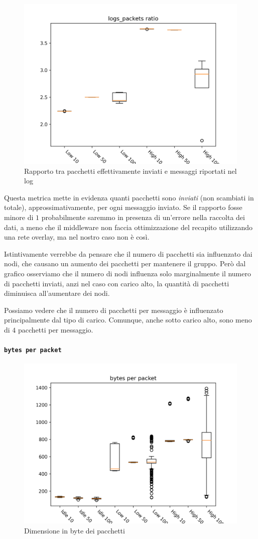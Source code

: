 \documentclass[target=bach]{thud}
\begin{document}
\begin{figure}[H]
    \centering
    \includegraphics[width=0.7\linewidth, keepaspectratio]{graphs/logs_packets ratio.png}
    \caption{Rapporto tra pacchetti effettivamente inviati e messaggi riportati nel log}
    \label{fig:lpr}
\end{figure}

Questa metrica mette in evidenza quanti pacchetti sono \emph{inviati} (non scambiati in totale), approssimativamente, per ogni messaggio inviato.
Se il rapporto fosse minore di $1$ probabilmente saremmo in presenza di un'errore nella raccolta dei dati, a meno che il middleware non faccia ottimizzazione del recapito utilizzando una rete overlay, ma nel nostro caso non è così.

Istintivamente verrebbe da pensare che il numero di pacchetti sia influenzato dai nodi, che causano un aumento dei pacchetti per mantenere il gruppo.
Però dal grafico osserviamo che il numero di nodi influenza solo marginalmente il numero di pacchetti inviati, anzi nel caso con carico alto, la quantità di pacchetti diminuisca all'aumentare dei nodi.

Possiamo vedere che il numero di pacchetti per messaggio è influenzato principalmente dal tipo di carico. Comunque, anche sotto carico alto, sono meno di $4$ pacchetti per messaggio.

\paragraph{\lstinline{bytes per packet}}

\begin{figure}[H]
    \centering
    \includegraphics[width=0.7\linewidth, keepaspectratio]{graphs/bytes per packet.png}
    \caption{Dimensione in byte dei pacchetti}
    \label{fig:bp}
\end{figure}
\end{document}
